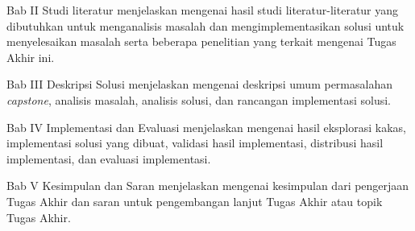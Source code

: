 Bab II Studi literatur menjelaskan mengenai hasil studi literatur-literatur yang
dibutuhkan untuk menganalisis masalah dan mengimplementasikan solusi untuk
menyelesaikan masalah serta beberapa penelitian yang terkait mengenai Tugas
Akhir ini.

Bab III Deskripsi Solusi menjelaskan mengenai deskripsi umum permasalahan
\textit{capstone}, analisis masalah, analisis solusi, dan rancangan implementasi
solusi.

Bab IV Implementasi dan Evaluasi menjelaskan mengenai hasil eksplorasi kakas,
implementasi solusi yang dibuat, validasi hasil implementasi, distribusi hasil
implementasi, dan evaluasi implementasi.

Bab V Kesimpulan dan Saran menjelaskan mengenai kesimpulan dari pengerjaan Tugas
Akhir dan saran untuk pengembangan lanjut Tugas Akhir atau topik Tugas Akhir.
